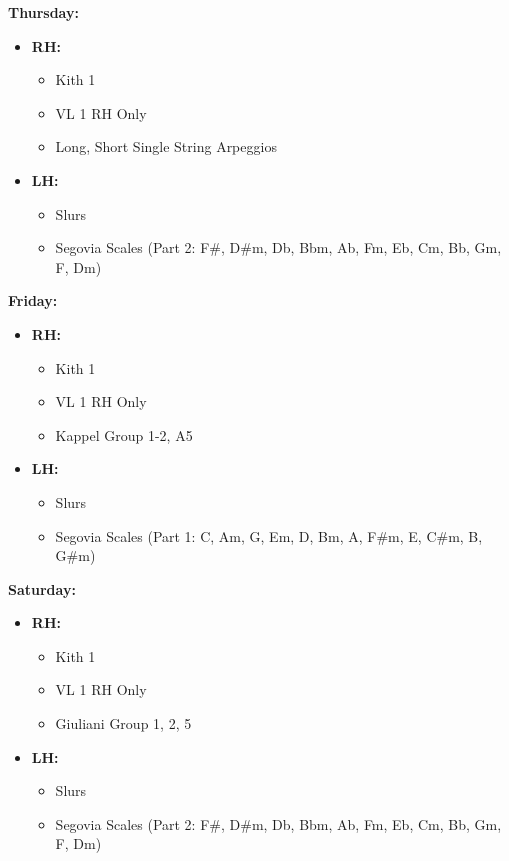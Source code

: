 \documentclass{article}
\begin{document}
\textbf{Thursday:}
\begin{itemize}
    \item \textbf{RH:}
    \begin{itemize}
        \item Kith 1
        \item VL 1 RH Only
        \item Long, Short Single String Arpeggios
    \end{itemize}
    \item \textbf{LH:}
    \begin{itemize}
        \item Slurs
        \item Segovia Scales (Part 2: F\#, D\#m, Db, Bbm, Ab, Fm, Eb, Cm, Bb, Gm, F, Dm)
    \end{itemize}
\end{itemize}

\textbf{Friday:}
\begin{itemize}
    \item \textbf{RH:}
    \begin{itemize}
        \item Kith 1
        \item VL 1 RH Only
        \item Kappel Group 1-2, A5
    \end{itemize}
    \item \textbf{LH:}
    \begin{itemize}
        \item Slurs
        \item Segovia Scales (Part 1: C, Am, G, Em, D, Bm, A, F\#m, E, C\#m, B, G\#m)
    \end{itemize}
\end{itemize}

\textbf{Saturday:}
\begin{itemize}
    \item \textbf{RH:}
    \begin{itemize}
        \item Kith 1
        \item VL 1 RH Only
        \item Giuliani Group 1, 2, 5
    \end{itemize}
    \item \textbf{LH:}
    \begin{itemize}
        \item Slurs
        \item Segovia Scales (Part 2: F\#, D\#m, Db, Bbm, Ab, Fm, Eb, Cm, Bb, Gm, F, Dm)
    \end{itemize}
\end{itemize}
\end{document}

